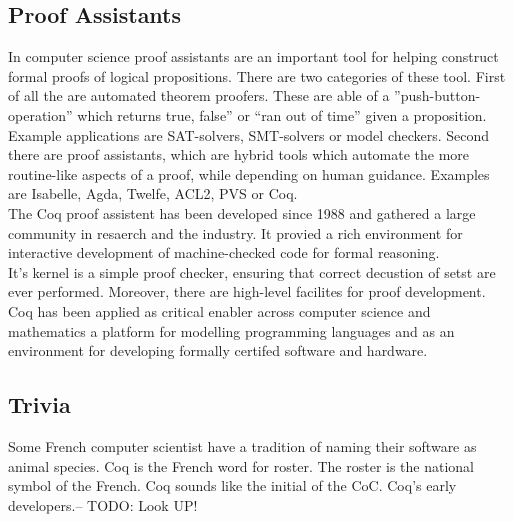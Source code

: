 \subsection{Proof Assistants}
In computer science proof assistants are an important tool for helping construct formal proofs of logical propositions.
There are two categories of these tool.
First of all the are automated theorem proofers. These are able of a ''push-button- operation'' which returns true, false'' or ``ran out of time'' given a proposition.
Example applications are SAT-solvers, SMT-solvers or model checkers. 
Second there are proof assistants, which are hybrid tools which automate the more routine-like aspects of a proof, while depending on human guidance. 
Examples are \gls{Isabelle}, Agda, Twelfe, ACL2, PVS or Coq.\\
The Coq proof assistent has been developed since 1988 and gathered a large community in resaerch and the industry.
It provied a rich environment for interactive development of machine-checked code for formal reasoning.\\
It's kernel is a simple proof checker, ensuring that correct decustion of setst are ever performed. Moreover, there are high-level facilites for proof development.
Coq has been applied as critical enabler across computer science and mathematics a platform for modelling programming languages and as an environment for developing formally certifed software and hardware.
 

\subsection{Trivia}
Some French computer scientist have a tradition of naming their software as animal species.
Coq is the French word for roster.
The roster is the national symbol of the French.
Coq sounds like the initial of the \gls{CoC}.
Coq's early developers.-- TODO: Look UP! 

